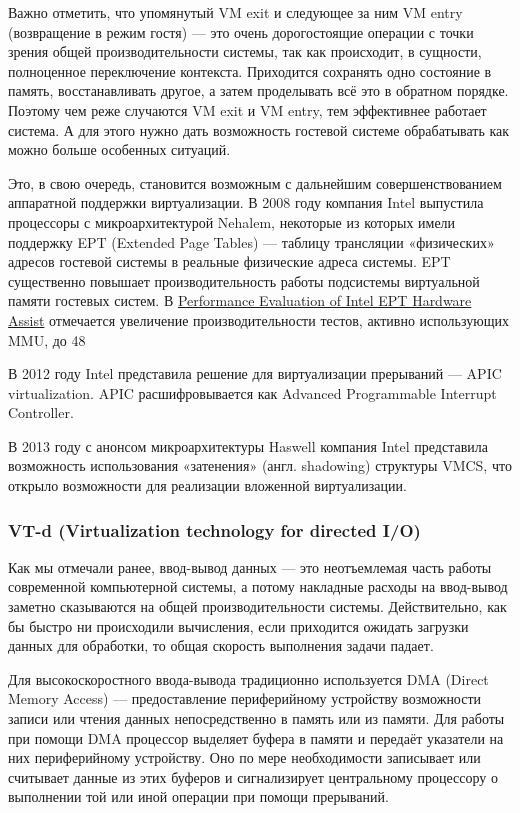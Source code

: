 \documentclass[14pt, a4paper]{article}
\begin{document}
Важно отметить, что упомянутый VM exit и следующее за ним VM entry (возвращение в режим гостя)
— это очень дорогостоящие операции с точки зрения общей производительности системы, так как
происходит, в сущности, полноценное переключение контекста. Приходится сохранять одно состояние
в память, восстанавливать другое, а затем проделывать всё это в обратном порядке. Поэтому чем
реже случаются VM exit и VM entry, тем эффективнее работает система. А для этого нужно дать
возможность гостевой системе обрабатывать как можно больше особенных ситуаций.

Это, в свою очередь, становится возможным с дальнейшим совершенствованием аппаратной
поддержки виртуализации. В 2008 году компания Intel выпустила процессоры с микроархитектурой
Nehalem, некоторые из которых имели поддержку EPT (Extended Page Tables) — таблицу трансляции
«физических» адресов гостевой системы в реальные физические адреса системы. EPT существенно
повышает производительность работы подсистемы виртуальной памяти гостевых систем. В
\href{http://www.vmware.com/pdf/Perf_ESX_Intel-EPT-eval.pdf}{Performance Evaluation of Intel EPT Hardware Assist}
отмечается увеличение производительности тестов, активно использующих MMU, до 48%

В 2012 году Intel представила решение для виртуализации прерываний — APIC virtualization. APIC
расшифровывается как Advanced Programmable Interrupt Controller.

В 2013 году с анонсом микроархитектуры Haswell компания Intel представила возможность
использования «затенения» (англ. shadowing) структуры VMCS, что открыло возможности для
реализации вложенной виртуализации.\\

\subsubsection*{\textbf{VT-d (Virtualization technology for directed I/O)}}

Как мы отмечали ранее, ввод-вывод данных — это неотъемлемая часть работы современной
компьютерной системы, а потому накладные расходы на ввод-вывод заметно сказываются на общей
производительности системы. Действительно, как бы быстро ни происходили вычисления, если
приходится ожидать загрузки данных для обработки, то общая скорость выполнения задачи падает.

Для высокоскоростного ввода-вывода традиционно используется DMA (Direct Memory Access) —
предоставление периферийному устройству возможности записи или чтения данных непосредственно
в память или из памяти. Для работы при помощи DMA процессор выделяет буфера в памяти и
передаёт указатели на них периферийному устройству. Оно по мере необходимости записывает или
считывает данные из этих буферов и сигнализирует центральному процессору о выполнении той или
иной операции при помощи прерываний.
\end{document}
